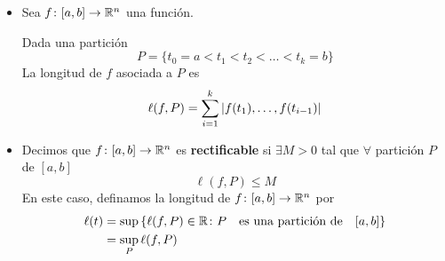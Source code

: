 \begin{itemize}
	\item Sea $f \colon [a, b] \rightarrow \mathbb{R}^{n}$ una función.
	
	Dada una partición 
	$$
	P = \{t_0 =a< t_1< t_2<\ldots< t_k =b\}
	$$
	La longitud de $f$ asociada a $P$ es
	$$
	\ell(f, P) = \sum_{i=1}^{k} \abs{f(t_1), \ldots, f(t_{i-1})}
	$$
	\item Decimos que $f \colon [a, b] \rightarrow \mathbb{R}^{n}$ es \textbf{rectificable} si $\exists M>0$ tal que $\forall$ partición $P$ de $[a, b]$
	$$
	\ell(f, P) \leq M
	$$
	En este caso, definamos la longitud de $f \colon [a, b] \rightarrow \mathbb{R}^{n}$ por 
	\begin{align*}
		\ell(t) & = \sup \left\lbrace \ell(f, P) \in \mathbb{R} \colon P \quad \text{es una partición de} \quad [a, b] \right\rbrace \\
		&= \sup\limits_{P}  \ell(f, P)
	\end{align*}
	
\end{itemize}
\newpage
{}